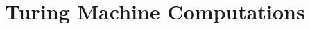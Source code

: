 \documentclass[open-logic-chapter]{subfiles}
\begin{document}
\chapter{Turing Machine Computations}






\end{document}
